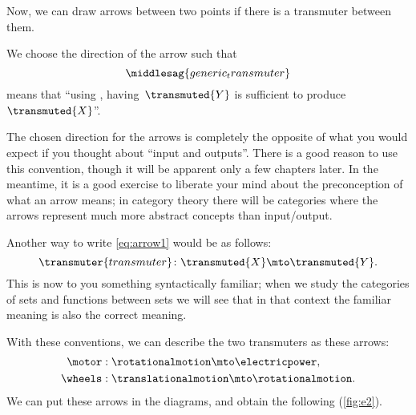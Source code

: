 Now, we can draw arrows between two points if there is a transmuter between them.

We choose the direction of the arrow such that
%
\begin{equation}
	\label{eq:arrow1}
	\middlesag{generic_transmuter}
\end{equation}
means that ``using , having~$\transmuted{Y}$ is sufficient to produce~$\transmuted{X}$''.

\begin{remark}
	The chosen direction for the arrows is completely the opposite of what you would expect if you thought about ``input and outputs''.
	There is a good reason to use this convention, though it will be apparent only a few chapters later.
	In the meantime, it is a good exercise to liberate your mind about the preconception of what an arrow means; in category theory there will be categories where the arrows represent much more abstract concepts than input/output.
\end{remark}

Another way to write \cref{eq:arrow1} would be as follows:
\begin{equation}
	\transmuter{transmuter} \colon \transmuted{X} \mto \transmuted{Y}.
\end{equation}
This is now to you something syntactically familiar; when we study the categories of sets and functions between sets we will see that in that context the familiar meaning is also the correct meaning.

With these conventions, we can describe the two transmuters as these arrows:
%
\begin{equation}
	\label{eq:transmutation_example}
	\begin{aligned}
		\motor  & :  \rotationalmotion \mto \electricpower,      \\
		\wheels & : \translationalmotion \mto \rotationalmotion.
	\end{aligned}
\end{equation}
%
We can put these arrows in the diagrams, and obtain the following (\cref{fig:e2}).



